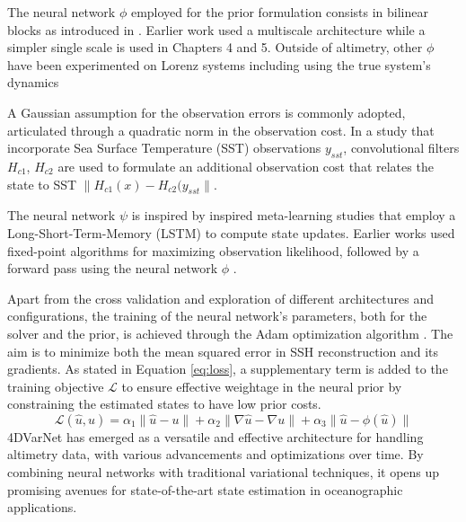 \begin{bibunit}
The neural network $\phi$ employed for the prior formulation consists in bilinear blocks as introduced in \cite{fabletBilinearResidualNeural2018}. Earlier work \cite{fabletENDTOENDPHYSICSINFORMEDREPRESENTATION2021} used a multiscale architecture while a simpler single scale is used in Chapters 4 and 5. Outside of altimetry, other $\phi$ have been experimented on Lorenz systems including using the true system's dynamics\cite{fabletLearningVariationalData2021}

A Gaussian assumption for the observation errors is commonly adopted, articulated through a quadratic norm in the observation cost. In a study that incorporate Sea Surface Temperature (SST) observations $y_{sst} $\cite{fabletMultimodal4DVarNetsReconstruction2023}, convolutional filters $H_{c1}$, $H_{c2}$ are used to formulate an additional observation cost that relates the state to SST $\| H_{c1}(x) - H_{c2}(y_{sst}\|$.


The neural network $\psi$ is inspired by inspired meta-learning studies \cite{andrychowiczLearningLearnGradient} that employ a Long-Short-Term-Memory (LSTM) to compute state updates\cite{fabletENDTOENDPHYSICSINFORMEDREPRESENTATION2021}. Earlier works used fixed-point algorithms for maximizing observation likelihood, followed by a forward pass using the neural network $\phi$ \cite{beauchampDatadrivenLearningbasedInterpolations2021}. 

Apart from the cross validation and exploration of different architectures and configurations, the training of the neural network's parameters, both for the solver and the prior, is achieved through the Adam optimization algorithm \cite{kingmaAdamMethodStochastic2017}. The aim is to minimize both the mean squared error in SSH reconstruction and its gradients. As stated in Equation \ref{eq:loss}, a supplementary term is added to the training objective $\mathcal{L}$ to ensure effective weightage in the neural prior by constraining the estimated states to have low prior costs.
\begin{equation}
    \mathcal{L}(\hat{u}, u) = \alpha_1\| \hat{u} - u \| 
  + \alpha_2\| \nabla \hat{u} - \nabla u \| 
 + \alpha_3\| \hat{u} - \phi (\hat{u}) \|
 \label{eq:loss}
\end{equation}
4DVarNet has emerged as a versatile and effective architecture for handling altimetry data, with various advancements and optimizations over time. By combining neural networks with traditional variational techniques, it opens up promising avenues for state-of-the-art state estimation in oceanographic applications.

\end{bibunit}


